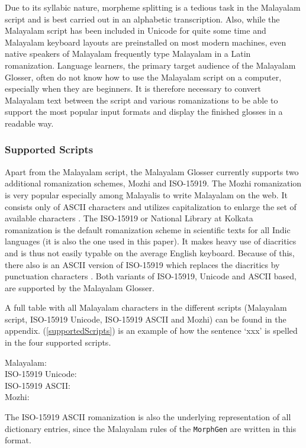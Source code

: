 \documentclass[a4paper]{article}
\newcommand{\typ}[1]{\texttt{#1}}
\begin{document}
Due to its syllabic nature, morpheme splitting is a tedious task in the Malayalam script and is best carried out in an alphabetic transcription. Also, while the Malayalam script has been included in Unicode for quite some time and Malayalam keyboard layouts are preinstalled on most modern machines, even native speakers of Malayalam frequently type Malayalam in a Latin romanization. Language learners, the primary target audience of the Malayalam Glosser, often do not know how to use the Malayalam script on a computer, especially when they are beginners. It is therefore necessary to convert Malayalam text between the script and various romanizations to be able to support the most popular input formats and display the finished glosses in a readable way.

\subsubsection{Supported Scripts}

Apart from the Malayalam script, the Malayalam Glosser currently supports two additional romanization schemes, Mozhi and ISO-15919. The Mozhi romanization is very popular especially among Malayalis to write Malayalam on the web. It consists only of ASCII characters and utilizes capitalization to enlarge the set of available characters \parencite{mozhi}. The ISO-15919 or National Library at Kolkata romanization is the default romanization scheme in scientific texts for all Indic languages (it is also the one used in this paper). It makes heavy use of diacritics and is thus not easily typable on the average English keyboard. Because of this, there also is an ASCII version of ISO-15919 which replaces the diacritics by punctuation characters \parencite{iso-15919}. Both variants of ISO-15919, Unicode and ASCII based, are supported by the Malayalam Glosser.

A full table with all Malayalam characters in the different scripts (Malayalam script, ISO-15919 Unicode, ISO-15919 ASCII and Mozhi) can be found in the appendix. (\ref{supportedScripts}) is an example of how the sentence `xxx' is spelled in the four supported scripts.

\ex
Malayalam: \\
ISO-15919 Unicode: \\
ISO-15919 ASCII: \\
Mozhi: 
\label{supportedScripts}\xe

The ISO-15919 ASCII romanization is also the underlying representation of all dictionary entries, since the Malayalam rules of the \typ{MorphGen} are written in this format.
\end{document}

